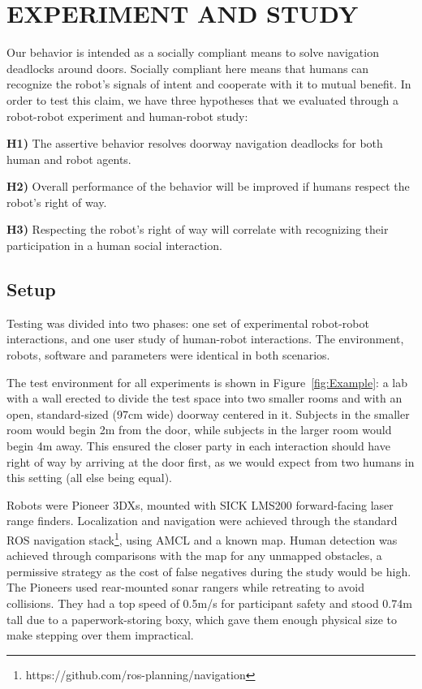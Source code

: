 \documentclass[letterpaper, 10 pt, conference]{ieeeconf}  %
\begin{document}

\section{EXPERIMENT AND STUDY}

Our behavior is intended as a socially compliant means to solve navigation deadlocks around doors. Socially compliant here means that humans can recognize the robot's signals of intent and cooperate with it to mutual benefit. In order to test this claim, we have three hypotheses that we evaluated through a robot-robot experiment and human-robot study:

\textbf{H1)} The assertive behavior resolves doorway navigation deadlocks for both human and robot agents.

\textbf{H2)} Overall performance of the behavior will be improved if humans respect the robot's right of way.

\textbf{H3)} Respecting the robot's right of way will correlate with recognizing their participation in a human social interaction.


\subsection{Setup}

Testing was divided into two phases: one set of experimental robot-robot interactions, and one user study of human-robot interactions. The environment, robots, software and parameters were identical in both scenarios.

The test environment for all experiments is shown in Figure~\ref{fig:Example}: a lab with a wall erected to divide the test space into two smaller rooms and with an open, standard-sized (97cm wide) doorway centered in it. Subjects in the smaller room would begin 2m from the door, while subjects in the larger room would begin 4m away. This ensured the closer party in each interaction should have right of way by arriving at the door first, as we would expect from two humans in this setting (all else being equal).


Robots were Pioneer 3DXs, mounted with SICK LMS200 forward-facing laser range finders. Localization and navigation were achieved through the standard ROS navigation stack\footnote{https://github.com/ros-planning/navigation}, using AMCL and a known map. Human detection was achieved through comparisons with the map for any unmapped obstacles, a permissive strategy as the cost of false negatives during the study would be high. The Pioneers used rear-mounted sonar rangers while retreating to avoid collisions. They had a top speed of 0.5m/s for participant safety and stood 0.74m tall due to a paperwork-storing boxy, which gave them enough physical size to make stepping over them impractical.
\end{document}
